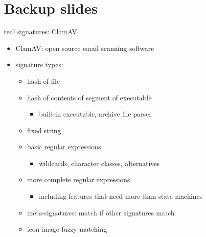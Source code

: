 \section{Backup slides}
\begin{frame}{real signatures: ClamAV}
\begin{itemize}
\item ClamAV: open source email scanning software
\item signature types:
    \begin{itemize}
    \item hash of file
    \item hash of contents of segment of executable
        \begin{itemize}
        \item built-in executable, archive file parser
        \end{itemize}
    \item fixed string
    \item basic regular expressions
        \begin{itemize}
        \item wildcards, character classes, alternatives
        \end{itemize}
    \item more complete regular expressions
        \begin{itemize}
        \item including features that need more than state machines
        \end{itemize}
    \item meta-signatures: match if other signatures match
    \item icon image fuzzy-matching
    \end{itemize}
\end{itemize}
\end{frame}

